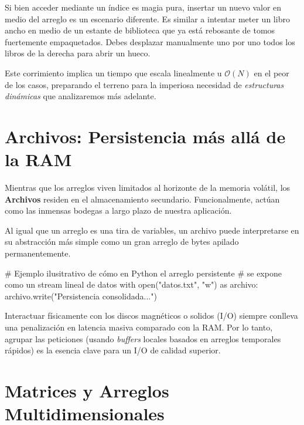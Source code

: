\documentclass[
  spanish,
  letterpaper,
  DIV=11,
  numbers=noendperiod]{scrreprt}
\newenvironment{Shaded}{\begin{snugshade}}{\end{snugshade}}
\newcommand{\CommentTok}[1]{\textcolor[rgb]{0.37,0.37,0.37}{#1}}
\newcommand{\FunctionTok}[1]{\textcolor[rgb]{0.28,0.35,0.67}{#1}}
\newcommand{\NormalTok}[1]{\textcolor[rgb]{0.00,0.23,0.31}{#1}}
\newcommand{\SpecialCharTok}[1]{\textcolor[rgb]{0.37,0.37,0.37}{#1}}
\newcommand{\StringTok}[1]{\textcolor[rgb]{0.13,0.47,0.30}{#1}}
\begin{document}
Si bien acceder mediante un índice es magia pura, insertar un nuevo
valor en medio del arreglo es un escenario diferente. Es similar a
intentar meter un libro ancho en medio de un estante de biblioteca que
ya está rebosante de tomos fuertemente empaquetados. Debes desplazar
manualmente uno por uno todos los libros de la derecha para abrir un
hueco.

Este corrimiento implica un tiempo que escala linealmente u
\(\mathcal{O}(N)\) en el peor de los casos, preparando el terreno para
la imperiosa necesidad de \emph{estructuras dinámicas} que analizaremos
más adelante.

\section{Archivos: Persistencia más allá de la RAM}\label{sec-archivos}

Mientras que los arreglos viven limitados al horizonte de la memoria
volátil, los \textbf{Archivos} residen en el almacenamiento secundario.
Funcionalmente, actúan como las inmensas bodegas a largo plazo de
nuestra aplicación.

Al igual que un arreglo es una tira de variables, un archivo puede
interpretarse en su abstracción más simple como un gran arreglo de bytes
apilado permanentemente.

\begin{Shaded}
\begin{Highlighting}[]
\CommentTok{\# Ejemplo ilusitrativo de cómo en Python el arreglo persistente }
\CommentTok{\# se expone como un stream lineal de datos}
\NormalTok{with }\FunctionTok{open}\NormalTok{(}\StringTok{"datos.txt"}\NormalTok{, }\StringTok{"w"}\NormalTok{) as archivo}\SpecialCharTok{:}
    \FunctionTok{archivo.write}\NormalTok{(}\StringTok{"Persistencia consolidada..."}\NormalTok{)}
\end{Highlighting}
\end{Shaded}

Interactuar físicamente con los discos magnéticos o solidos (I/O)
siempre conlleva una penalización en latencia masiva comparado con la
RAM. Por lo tanto, agrupar las peticiones (usando \emph{buffers} locales
basados en arreglos temporales rápidos) es la esencia clave para un I/O
de calidad superior.

\section{Matrices y Arreglos Multidimensionales}\label{sec-matrices}
\end{document}
